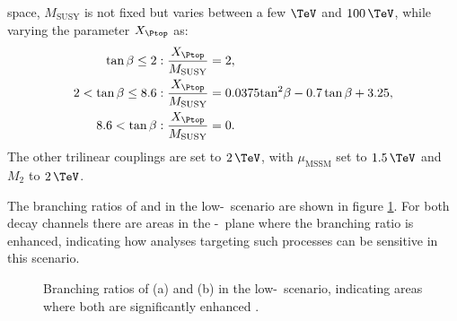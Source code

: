 space, 
$M_{\text{SUSY}}$ is not fixed but varies between a few $\TeV$ and $100\,\TeV$, while
varying the parameter $X_{\Ptop}$ as:
\begin{equation}
\begin{split}
\tan{\beta} \leq 2 &: \frac{X_{\Ptop}}{M_{\text{SUSY}}} = 2,\\
2 < \tan{\beta} \leq 8.6 &: \frac{X_{\Ptop}}{M_{\text{SUSY}}} = 0.0375\text{tan}^2\beta - 0.7\tan{\beta} + 3.25,\\
8.6 < \tan{\beta} &: \frac{X_{\Ptop}}{M_{\text{SUSY}}} = 0.
\end{split}
\end{equation}
The other trilinear couplings are set to $2\,\TeV$, with $\mu_{\text{MSSM}}$ set to $1.5\,\TeV$ and $M_2$ to $2\,\TeV$.

The branching ratios of \Htohh and \AtoZh in the low-\tanb~scenario are shown in
figure \ref{fig:lowtbhigh_br}. For both decay channels there are areas in the \mA-\tanb~plane
where the branching ratio is enhanced, indicating how analyses targeting such processes 
can be sensitive in this scenario. %

\begin{figure}[h!]
\begin{center}
\end{center}
\caption[Branching ratios of \Htohh and \AtoZh in the low-\tanb~scenario.]{Branching ratios of (a) \Htohh and (b) \AtoZh in the low-\tanb~scenario, indicating 
areas where both are significantly enhanced \cite{MSSM-lowtanb}.}
\label{fig:lowtbhigh_br}
\end{figure}

